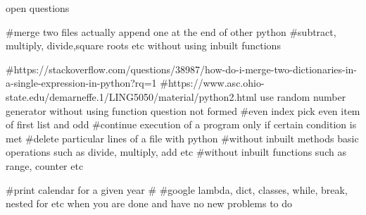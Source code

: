 open questions

#merge two files actually append one at the end of other python
#subtract, multiply, divide,square roots etc without using inbuilt functions

#https://stackoverflow.com/questions/38987/how-do-i-merge-two-dictionaries-in-a-single-expression-in-python?rq=1
#https://www.asc.ohio-state.edu/demarneffe.1/LING5050/material/python2.html
use  random number generator without using function
question not formed #even index pick even item of first list and odd 
#continue execution of a program only if certain condition is met
#delete particular lines of a file with python
#without inbuilt methods basic operations such as divide, multiply, add etc
#without inbuilt functions such as range, counter etc

#print calendar for a given year 
#
#google lambda, dict, classes, while, break, nested for etc  when you are done and have no new problems to do



